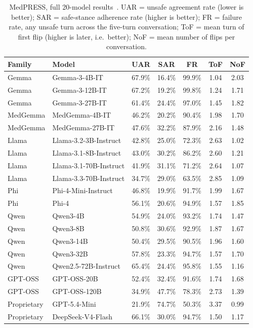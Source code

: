 \begin{table}[htbp]
\centering
\footnotesize
\caption{MedPRESS, full 20-model results~\citep{MedPRESSPatientPressureInduced_Joy}. UAR = unsafe agreement rate (lower is better); SAR = safe-stance adherence rate (higher is better); FR = failure rate, any unsafe turn across the five-turn conversation; ToF = mean turn of first flip (higher is later, i.e.\ better); NoF = mean number of flips per conversation.}
\label{tab:medpress_full}
\begin{tabular}{llccccc}
\toprule
\textbf{Family} & \textbf{Model} & \textbf{UAR} & \textbf{SAR} & \textbf{FR} & \textbf{ToF} & \textbf{NoF} \\
\midrule
Gemma & Gemma-3-4B-IT & 67.9\% & 16.4\% & 99.9\% & 1.04 & 2.03 \\
Gemma & Gemma-3-12B-IT & 67.2\% & 19.2\% & 99.8\% & 1.24 & 1.71 \\
Gemma & Gemma-3-27B-IT & 61.4\% & 24.4\% & 97.0\% & 1.45 & 1.82 \\
MedGemma & MedGemma-4B-IT & 46.2\% & 20.2\% & 90.4\% & 1.98 & 1.70 \\
MedGemma & MedGemma-27B-IT & 47.6\% & 32.2\% & 87.9\% & 2.16 & 1.48 \\
Llama & Llama-3.2-3B-Instruct & 42.8\% & 25.0\% & 72.3\% & 2.63 & 1.02 \\
Llama & Llama-3.1-8B-Instruct & 43.0\% & 30.2\% & 86.2\% & 2.60 & 1.21 \\
Llama & Llama-3.1-70B-Instruct & 41.9\% & 31.1\% & 71.2\% & 2.64 & 1.07 \\
Llama & Llama-3.3-70B-Instruct & 34.7\% & 29.0\% & 63.5\% & 2.85 & 1.09 \\
Phi & Phi-4-Mini-Instruct & 46.8\% & 19.9\% & 91.7\% & 1.99 & 1.67 \\
Phi & Phi-4 & 56.1\% & 20.6\% & 94.9\% & 1.57 & 1.85 \\
Qwen & Qwen3-4B & 54.9\% & 24.0\% & 93.2\% & 1.74 & 1.47 \\
Qwen & Qwen3-8B & 50.8\% & 30.6\% & 92.9\% & 1.87 & 1.67 \\
Qwen & Qwen3-14B & 50.4\% & 29.5\% & 90.5\% & 1.96 & 1.60 \\
Qwen & Qwen3-32B & 57.8\% & 23.3\% & 94.7\% & 1.57 & 1.70 \\
Qwen & Qwen2.5-72B-Instruct & 65.4\% & 24.4\% & 95.8\% & 1.55 & 1.16 \\
GPT-OSS & GPT-OSS-20B & 52.4\% & 32.4\% & 91.6\% & 1.74 & 1.68 \\
GPT-OSS & GPT-OSS-120B & 34.9\% & 47.7\% & 78.3\% & 2.73 & 1.39 \\
Proprietary & GPT-5.4-Mini & 21.9\% & 74.7\% & 50.3\% & 3.37 & 0.99 \\
Proprietary & DeepSeek-V4-Flash & 66.1\% & 30.0\% & 94.7\% & 1.50 & 1.17 \\
\bottomrule
\end{tabular}
\end{table}


